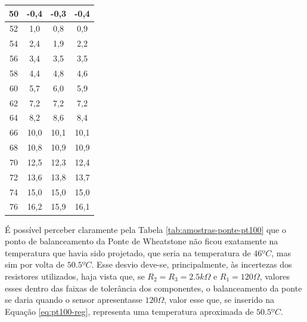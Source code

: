 \documentclass[a4paper]{instrumentacao}
\begin{document}
\begin{table}[H]
\begin{tabular}{|c|c|c|c|}
50                  & -0,4                   & -0,3                   & -0,4                \\ \hline
52                  & 1,0                    & 0,8                    & 0,9                 \\ \hline
54                  & 2,4                    & 1,9                    & 2,2                 \\ \hline
56                  & 3,4                    & 3,5                    & 3,5                 \\ \hline
58                  & 4,4                    & 4,8                    & 4,6                 \\ \hline
60                  & 5,7                    & 6,0                    & 5,9                 \\ \hline
62                  & 7,2                    & 7,2                    & 7,2                 \\ \hline
64                  & 8,2                    & 8,6                    & 8,4                 \\ \hline
66                  & 10,0                   & 10,1                   & 10,1                \\ \hline
68                  & 10,8                   & 10,9                   & 10,9                \\ \hline
70                  & 12,5                   & 12,3                   & 12,4                \\ \hline
72                  & 13,6                   & 13,8                   & 13,7                \\ \hline
74                  & 15,0                   & 15,0                   & 15,0                \\ \hline
76                  & 16,2                   & 15,9                   & 16,1                \\ \hline
\end{tabular}
\end{table}

É possível perceber claramente pela Tabela \ref{tab:amostras-ponte-pt100} que o ponto de balanceamento da Ponte de Wheatstone não ficou exatamente na temperatura que havia sido projetado, que seria na temperatura de $46ºC$, mas sim por volta de $50.5ºC$. Esse desvio deve-se, principalmente, às incertezas dos resistores utilizados, haja vista que, se $R_2=R_3=2.5k\Omega$ e $R_1=120\Omega$, valores esses dentro das faixas de tolerância dos componentes, o balanceamento da ponte se daria quando o sensor apresentasse $120\Omega$, valor esse que, se inserido na Equação \ref{eq:pt100-reg}, representa uma temperatura aproximada de $50.5ºC$.
\end{document}
